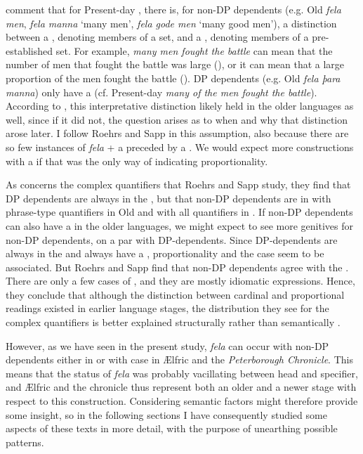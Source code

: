 \documentclass[output=paper,colorlinks,citecolor=brown]{langscibook}
\begin{document}
\citet[417]{RoehrsSapp18} comment that for Present-day , there is, for non-DP dependents (e.g. Old  \textit{fela men}, \textit{fela manna} ‘many men', \textit{fela gode men} ‘many good men'), a distinction between a , denoting members of a set, and a , denoting members of a pre-established set. For example, \textit{many men fought the battle} can mean that the number of men that fought the battle was large (), or it can mean that a large proportion of the men fought the battle (). DP dependents (e.g. Old  \textit{fela þara manna}) only have a  (cf. Present-day  \textit{many of the men fought the battle}). According to \citet[417]{RoehrsSapp18}, this interpretative distinction likely held in the older languages as well, since if it did not, the question arises as to when and why that distinction arose later. I follow Roehrs and Sapp in this assumption, also because there are so few instances of \textit{fela} + a  preceded by a . We would expect more constructions with a  if that was the only way of indicating proportionality. 

As concerns the complex quantifiers that Roehrs and Sapp study, they find that DP dependents are always in the , but that non-DP dependents are in  with phrase-type quantifiers in Old  and with all quantifiers in . If non-DP dependents can also have a  in the older languages, we might expect to see more genitives for non-DP dependents, on a par with DP-dependents. Since DP-dependents are always in the  and always have a , proportionality and the  case seem to be associated. But Roehrs and Sapp find that non-DP dependents agree with the . There are only a few cases of , and they are mostly idiomatic expressions. Hence, they conclude that although the distinction between cardinal and proportional readings existed in earlier language stages, the distribution they see for the complex quantifiers is better explained structurally rather than semantically \citeyearpar[417]{RoehrsSapp18}.

However, as we have seen in the present study, \textit{fela} can occur with non-DP dependents either in  or with  case in Ælfric and the \textit{Peterborough Chronicle}. This means that the status of \textit{fela} was probably vacillating between head and specifier, and Ælfric and the chronicle thus represent both an older and a newer stage with respect to this construction. Considering semantic factors might therefore provide some insight, so in the following sections I have consequently studied some aspects of these texts in more detail, with the purpose of unearthing possible patterns.
\end{document}
